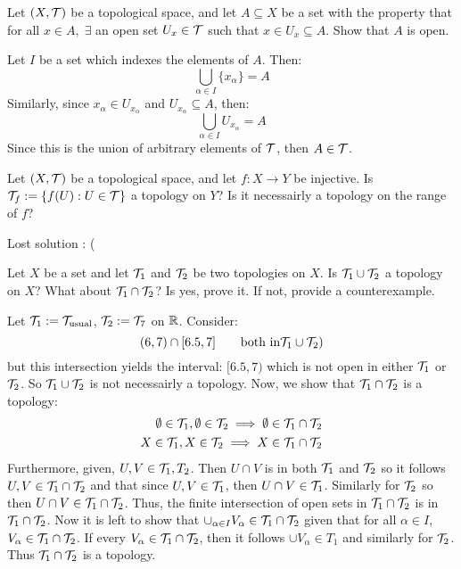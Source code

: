 \begin{ExerciseList}
    \Exercise[difficulty=1] Let $(X, \mathcal{T})$ be a topological space, %
    and let $A\subseteq X$ be a set with the property that for all %
    $x\in A,\;\exists$ an open set $U_x\in\mathcal{T}$ such that $x\in U_x %
    \subseteq A$. Show that $A$ is open.

    \Answer Let $I$ be a set which indexes the elements of $A$. Then:
    \[\bigcup_{\alpha\in I} \{x_{\alpha}\} = A\]
    Similarly, since $x_{\alpha} \in U_{x_{\alpha}}$ and %
    $U_{x_{\alpha}} \subseteq A$, then:
    \[\bigcup_{\alpha\in I} U_{x_{\alpha}} = A\]
    Since this is the union of arbitrary elements of $\mathcal{T}$, then %
    $A\in\mathcal{T}$.

    \Exercise[difficulty=1] Let $(X,\mathcal{T})$ be a topological space, and %
    let $f: X\to Y$ be injective. Is $\mathcal{T}_f := \{f(U): U\in\mathcal{T}\}$ a %
    topology on $Y$? Is it necessairly a topology on the range of $f$?

    \Answer Lost solution : (

    \Exercise[difficulty=1] Let $X$ be a set and let $\mathcal{T}_1$ and %
    $\mathcal{T}_2$ be two topologies on $X$. Is $\mathcal{T}_1\cup\mathcal{T}_2$ a topology %
    on $X$? What about $\mathcal{T}_1\cap\mathcal{T}_2$? Is yes, prove it. If not, %
    provide a counterexample.

    \Answer Let $\mathcal{T}_1 := \mathcal{T}_{\text{usual}}$, $\mathcal{T}_2 := \mathcal{T}_7$ on $\mathbb{R}$. 
    Consider:
    \[(6,7) \cap [6.5, 7] \qquad\text{both in}\mathcal{T}_1\cup\mathcal{T}_2)\]
    but this intersection yields the interval: $[6.5,7)$
    which is not open in either $\mathcal{T}_1$ or $\mathcal{T}_2$. So $\mathcal{T}_1\cup\mathcal{T}_2$ %
    is not necessairly a topology. Now, we show that $\mathcal{T}_1\cap\mathcal{T}_2$ %
    is a topology:\\
    \begin{align*}
        \emptyset\in\T_1,\emptyset\in\T_2\implies\emptyset%
        \in\T_1\cap\T_2 \\
        X\in\T_1, X\in\T_2 \implies X\in\T_1\cap\T_2
    \end{align*}
    Furthermore, given, $U,V\in\mathcal{T}_1,T_2$. Then $U\cap V$ is in both %
    $\mathcal{T}_1$ and $\mathcal{T}_2$ so it follows $U, V\in\mathcal{T}_1\cap\mathcal{T}_2$ and that %
    since $U,V\in\mathcal{T}_1$, then $U\cap V\in\mathcal{T}_1$. Similarly for $\mathcal{T}_2$ %
    so then $U\cap V\in\mathcal{T}_1\cap\mathcal{T}_2$. Thus, the finite intersection %
    of open sets in $\mathcal{T}_1\cap\mathcal{T}_2$ is in $\mathcal{T}_1\cap\mathcal{T}_2$. Now it is %
    left to show that $\cup_{\alpha\in I} V_{\alpha} \in %
    \T_1\cap\T_2$ given that for all $\alpha\in I$, $V_{\alpha} \in %
    \T_1\cap\T_2$. If every $V_{\alpha}\in\mathcal{T}_1\cap\mathcal{T}_2$, then it %
    follows $\cup V_{\alpha}\in T_1$ and similarly for $\mathcal{T}_2$.
    Thus $\mathcal{T}_1\cap\mathcal{T}_2$ is a topology.


\end{ExerciseList}
